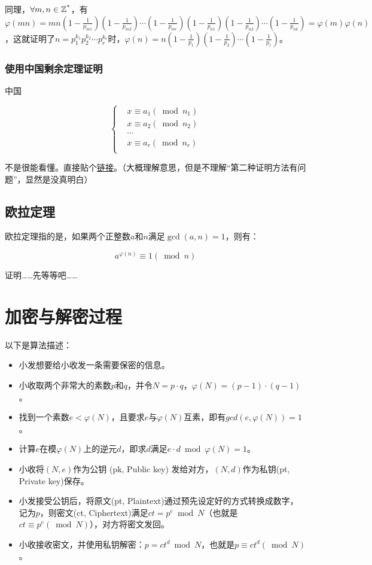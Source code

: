 \documentclass[a4paper]{article}  %
\begin{document}
同理，$\forall m, n \in \mathbb{Z\textsuperscript{*}}$，有$\varphi(mn)=mn(1-\frac{1}{p_{m1}})(1-\frac{1}{p_{m2}}) \cdots (1-\frac{1}{p_{mr}})(1-\frac{1}{p_{n1}})(1-\frac{1}{p_{n2}}) \cdots (1-\frac{1}{p_{nk}})=\varphi(m)\varphi(n)$，这就证明了$n = p_{1}^{k_1}p_{2}^{k_2}\cdots p_{r}^{k_r}$时，$\varphi(n)=n(1-\frac{1}{p_1})(1-\frac{1}{p_2})\cdots (1-\frac{1}{p_r})$。

\subsubsection{使用中国剩余定理证明}

中国

\[
	\left\{
	\begin{aligned}
		 & x \equiv a_1(\bmod n_1)\\
		 & x \equiv a_2(\bmod n_2)\\
		 & \cdots\\
		 & x \equiv a_r(\bmod n_r)\\
	\end{aligned}
	\right.
\]

不是很能看懂。直接贴个\href{https://zhuanlan.zhihu.com/p/600282116}{链接}。（大概理解意思，但是不理解“第二种证明方法有问题”，显然是没真明白）

\subsection[欧拉定理]{欧拉定理}

欧拉定理指的是，如果两个正整数$a$和$n$满足$\gcd(a, n) = 1$，则有：

\[
	a^{\varphi(n)} \equiv 1 (\bmod n)
\]

证明……先等等吧……
\section[算法描述]{加密与解密过程} \label{加密与解密过程}

以下是算法描述：
\begin{itemize}
	\item 小发想要给小收发一条需要保密的信息。
	\item 小收取两个非常大的素数$p$和$q$，并令$N = p \cdot q$，$\varphi(N) = (p - 1) \cdot (q - 1)$。
	\item 找到一个素数$e < \varphi(N)$，且要求$e$与$\varphi(N)$互素，即有$gcd(e, \varphi(N)) = 1$。 %
	\item 计算$e$在模$\varphi(N)$上的逆元$d$，即求$d$满足$e \cdot d \bmod \varphi(N) = 1$。
	\item 小收将$(N, e)$作为公钥 (pk, Public key) 发给对方，$(N, d)$作为私钥(pt, Private key)保存。
	\item 小发接受公钥后，将原文(pt, Plaintext)通过预先设定好的方式转换成数字，记为$p$，则密文(ct, Ciphertext)满足$ct = p ^ e \bmod N$（也就是$ct \equiv p ^ e (\bmod N)$），对方将密文发回。
	\item 小收接收密文，并使用私钥解密：$p = ct ^ d \bmod N$，也就是$p \equiv ct ^ d (\bmod N)$。
\end{itemize}
\end{document}
